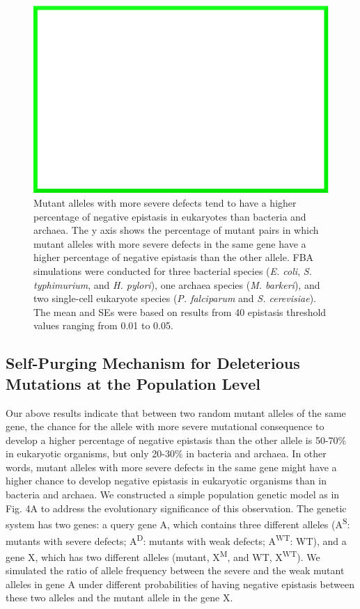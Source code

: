\begin{figure}
\centering
\includegraphics[width=\textwidth]{dummy}
\caption{Mutant alleles with more severe defects tend to have a higher
percentage of negative epistasis in eukaryotes than bacteria and
archaea. The y axis shows the percentage of mutant pairs in which
mutant alleles with more severe defects in the same gene have a higher
percentage of negative epistasis than the other allele. FBA
simulations were conducted for three bacterial species
(\textit{E. coli}, \textit{S. typhimurium}, and \textit{H. pylori}),
one archaea species (\textit{M. barkeri}), and two single-cell
eukaryote species (\textit{P. falciparum} and
\textit{S. cerevisiae}). The mean and SEs were based on results from
40 epistasis threshold values ranging from 0.01 to 0.05.}
\label{fig:speciesPurging}
\end{figure}

\subsection{Self-Purging Mechanism for Deleterious Mutations at the
Population Level}

Our above results indicate that between two random mutant alleles of
the same gene, the chance for the allele with more severe mutational
consequence to develop a higher percentage of negative epistasis than
the other allele is 50-70\% in eukaryotic organisms, but only 20-30\% in
bacteria and archaea. In other words, mutant alleles with more severe
defects in the same gene might have a higher chance to develop
negative epistasis in eukaryotic organisms than in bacteria and
archaea. We constructed a simple population genetic model as in
Fig. 4A to address the evolutionary significance of this
observation. The genetic system has two genes: a query gene A, which
contains three different alleles (A\textsuperscript{S}: mutants with
severe defects; A\textsuperscript{D}: mutants with weak defects;
A\textsuperscript{WT}: WT), and a gene X, which has two different
alleles (mutant, X\textsuperscript{M}, and WT,
X\textsuperscript{WT}). We simulated the ratio of allele frequency
between the severe and the weak mutant alleles in
gene A under different probabilities of having negative epistasis
between these two alleles and the mutant allele in the gene X.

